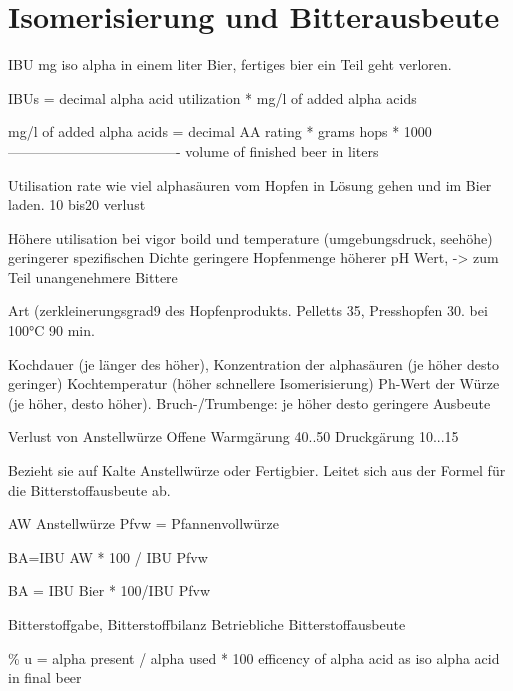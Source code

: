 \documentclass[a4paper,parskip=half]{scrartcl}
\begin{document}
\section*{Isomerisierung und Bitterausbeute}


 
\parencite[121]{Garetz1994} 
IBU mg iso alpha in einem liter Bier, fertiges bier
ein Teil geht verloren. 


\parencite{Tinseth1997}
IBUs = decimal alpha acid utilization * mg/l of added alpha acids

mg/l of added alpha acids = decimal AA rating * grams hops * 1000
                            -------------------------------------
                              volume of finished beer in liters
                              

\parencite[50]{Holle2010}
Utilisation rate wie viel alphasäuren vom Hopfen in Lösung gehen
und im Bier laden. 10 bis20 verlust

Höhere utilisation bei
vigor boild und temperature (umgebungsdruck, seehöhe)
geringerer spezifischen Dichte
geringere Hopfenmenge
höherer pH Wert, -> zum Teil unangenehmere Bittere

\parencite[159]{Annemueller2015}

Art (zerkleinerungsgrad9 des Hopfenprodukts. Pelletts 35, Presshopfen
30. bei 100°C 90 min.

Kochdauer (je länger des höher), Konzentration der alphasäuren (je höher desto geringer)
Kochtemperatur (höher schnellere Isomerisierung)
Ph-Wert der Würze (je höher, desto höher).
Bruch-/Trumbenge: je höher desto geringere Ausbeute 

\parencite[160]{Annemueller2015}
Verlust von Anstellwürze
Offene Warmgärung 40..50
Druckgärung 10...15

\parencite[162\psq]{Annemueller2015}
Bezieht sie auf Kalte Anstellwürze oder Fertigbier. Leitet sich aus der
Formel für die Bitterstoffausbeute ab. 

AW Anstellwürze
Pfvw = Pfannenvollwürze

BA=IBU AW * 100 / IBU Pfvw

BA = IBU Bier * 100/IBU Pfvw

\parencite[160-164]{Annemueller2015}
Bitterstoffgabe, Bitterstoffbilanz
Betriebliche Bitterstoffausbeute

\parencite[124]{Garetz1994} 

\% u = alpha present / alpha used * 100
efficency of alpha acid as iso alpha acid in final beer
\end{document}
